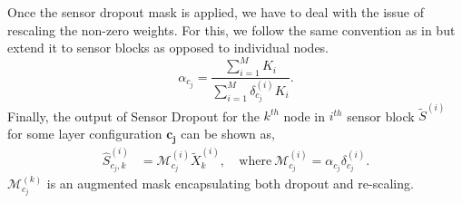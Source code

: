 \documentclass[../thesis.tex]{subfiles}
\begin{document}
Once the sensor dropout mask is applied, we have to deal with the issue of rescaling the non-zero weights. For this, we follow the same convention as in \citet{dropout} but extend it to sensor blocks as opposed to individual nodes. 
\begin{equation}
\alpha_{c_j} = \frac{\sum_{i=1}^M K_i }{\sum_{i=1}^M \delta_{c_j}^{(i)} K_i}.
\end{equation}
Finally, the output of Sensor Dropout for the $k^{th}$ node in $i^{th}$ sensor block $\tilde{S}^{(i)}$ for some layer configuration $\mathbf{c_j}$ can be shown as,
\begin{align}
\hat{S}^{(i)}_{{c_j},k} &= \mathcal{M}^{(i)}_{c_j} \tilde{X}_k^{(i)}, \ 
&\text{where} \ \mathcal{M}^{(i)}_{c_j} = \alpha_{c_j} \delta_{c_j}^{(i)}. 
\end{align}
$\mathcal{M}^{(k)}_{c_j}$ is an augmented mask encapsulating both dropout and re-scaling. 

\end{document}
